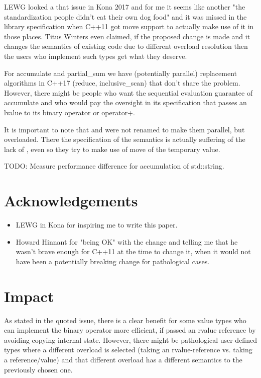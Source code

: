 \documentclass[ebook,11pt,article]{memoir}
\begin{document}
LEWG looked a that issue in Kona 2017 and for me it seems like another "the standardization people didn't eat their own dog food" and it was missed in the library specification when C++11 got move support to actually make use of it in those places. Titus Winters even claimed, if the proposed change is made and it changes the semantics of existing code due to different overload resolution then the users who implement such types get what they deserve.

For accumulate and partial_sum we have (potentially parallel) replacement algorithms in C++17 (reduce, inclusive_scan) that don't share the problem. However, there might be people who want the sequential evaluation guarantee of accumulate and who would pay the oversight in its specification that passes an lvalue to its binary operator or operator+. 

It is important to note that  and  were not renamed to make them parallel, but overloaded. There the specification of the semantics is actually suffering of the lack of , even so they try to make use of move of the temporary value. 

TODO: Measure performance difference for accumulation of std::string.

\chapter{Acknowledgements}
\begin{itemize}
\item LEWG in Kona for inspiring me to write this paper.
\item Howard Hinnant for "being OK" with the change and telling me that he wasn't brave enough for C++11 at the time to change it, when it would not have been a potentially breaking change for pathological cases.
\end{itemize}

\chapter{Impact}
As stated in the quoted issue, there is a clear benefit for some value types who can implement the binary operator more efficient, if passed an rvalue reference by avoiding copying internal state. However, there might be pathological user-defined types where a different overload is selected (taking an rvalue-reference vs. taking a reference/value) and that different overload has a different semantics to the previously chosen one.
\end{document}
